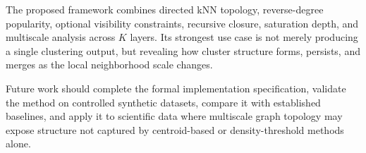 \documentclass[11pt,a4paper]{article}
\begin{document}
The proposed framework combines directed kNN topology, reverse-degree popularity, optional visibility constraints, recursive closure, saturation depth, and multiscale analysis across $K$ layers. Its strongest use case is not merely producing a single clustering output, but revealing how cluster structure forms, persists, and merges as the local neighborhood scale changes.

Future work should complete the formal implementation specification, validate the method on controlled synthetic datasets, compare it with established baselines, and apply it to scientific data where multiscale graph topology may expose structure not captured by centroid-based or density-threshold methods alone.



\end{document}
